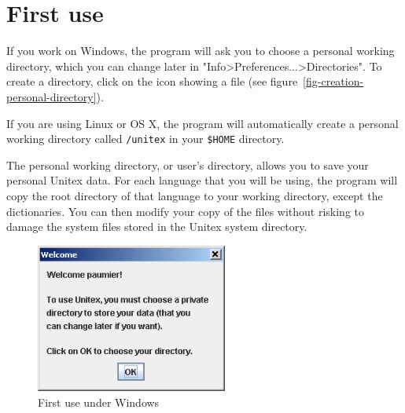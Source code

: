







\section{First use}
\label{section-first-use}
If you work on Windows, the program will ask you to choose a
 personal working  directory, which you can
change later in "Info>Preferences...>Directories". To create a directory, click
on the icon showing a file (see
figure~\ref{fig-creation-personal-directory}).

\bigskip
\noindent If you are using Linux or OS X, the program will automatically create a
personal working directory called \verb+/unitex+ in your \verb+$HOME+ directory.

\bigskip
\noindent The personal working directory, or user's directory, allows
you to save your personal Unitex data. For each language that you will be using, the
program will copy the root directory of that language to your working
directory, except the dictionaries. You can then modify your copy of the
files without risking to damage the system files stored in the
Unitex system directory.

\begin{figure}[!ht]
\begin{center}
\includegraphics[width=6.3cm]{resources/img/fig1-1.png}
\caption{First use under Windows}
\end{center}
\end{figure}

